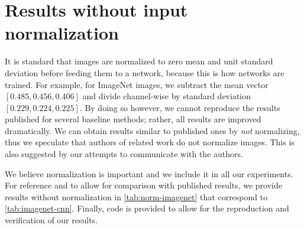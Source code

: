 \section{Results without input normalization}
\label{sec:without-norm}

It is standard that images are normalized to zero mean and unit standard deviation before feeding them to a network, because this is how networks are trained. For example, for ImageNet images, we subtract the mean vector $[0.485,0.456,0.406]$ and divide channel-wise by standard deviation $[0.229,0.224,0.225]$. By doing so however, we cannot reproduce the results published for several baseline methods; rather, all results are improved dramatically. We can obtain results similar to published ones by \emph{not} normalizing, thus we speculate that authors of related work do not normalize images. This is also suggested by our attempts to communicate with the authors.

We believe normalization is important and we include it in all our experiments. For reference and to allow for comparison with published results, we provide results without normalization in \autoref{tab:norm-imagenet} that correspond to \autoref{tab:imagenet-cnn}. Finally, code is provided to allow for the reproduction and verification of our results.

% 
% 

% 
% 




